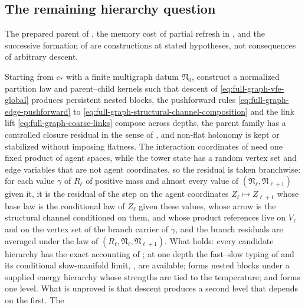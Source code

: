 \subsection{The remaining hierarchy question}
\label{sec:full-graph-vfe-target}

The prepared parent of , the memory cost of
partial refresh in , and the successive formation of
 are constructions at stated hypotheses, not
consequences of arbitrary descent.

Starting from $c_*$ with a finite multigraph datum $\mathfrak N_0$, construct a
normalized partition law and parent--child kernels such that descent of
\eqref{eq:full-graph-vfe-global} produces persistent nested blocks, the pushforward
rules \eqref{eq:full-graph-edge-pushforward} to
\eqref{eq:full-graph-structural-channel-composition} and the link lift
\eqref{eq:full-graph-coarse-links} compose across depths, the parent family has a
controlled closure residual in the sense of , and
non-flat holonomy is kept or stabilized without imposing flatness. The interaction coordinates of
 need one fixed product of agent spaces, while the tower state has a
random vertex set and edge variables that are not agent coordinates, so the residual is taken
branchwise: for each value $\gamma$ of $R_\ell$ of positive mass and almost every value of
$(\mathfrak N_\ell,\mathfrak N_{\ell+1})$ given it, it is the residual of the step on the agent coordinates
$Z_\ell\mapsto Z_{\ell+1}$ whose base law is the conditional law of $Z_\ell$ given these values,
whose arrow is the structural channel conditioned on them, and whose product references live on
$V_\ell$ and on the vertex set of the branch carrier of $\gamma$, and the branch residuals are
averaged under the law of $(R_\ell,\mathfrak N_\ell,\mathfrak N_{\ell+1})$. What holds: every
candidate hierarchy has the exact accounting of
; at one depth the fast--slow typing of
 and its conditional slow-manifold limit,
, are available; 
forms nested blocks under a supplied energy hierarchy whose strengths are tied to the
temperature; and  forms one level. What is
unproved is that descent produces a second level that depends on the first. The
